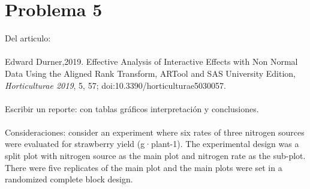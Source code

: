 \documentclass[a4paper,12pt]{article}
\begin{document}
\section*{Problema 5}
Del articulo: \\
\\Edward Durner,2019. Effective Analysis of Interactive Effects with Non Normal Data Using the Aligned Rank Transform, ARTool and SAS University Edition, \textit{Horticulturae 2019}, 5, 57; doi:10.3390/horticulturae5030057.\\
\\Escribir un reporte: con tablas gráficos interpretación y conclusiones.\\
\\Consideraciones: consider an experiment where six rates of three nitrogen sources were evaluated for strawberry yield (g·plant-1). The experimental design was a split plot with nitrogen source as the main plot and nitrogen rate as the sub-plot. There were five replicates of the main plot and the main plots were set in a randomized complete block design.\\
\end{document}
